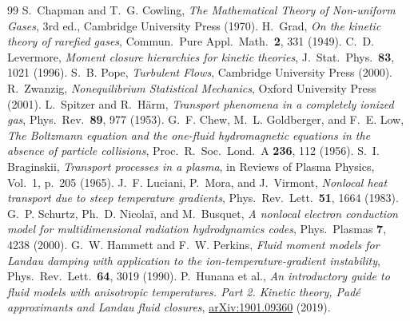 \documentclass[11pt]{article}
\begin{document}
\begin{thebibliography}{99}
S.~Chapman and T.~G. Cowling,
\emph{The Mathematical Theory of Non-uniform Gases},
3rd ed., Cambridge University Press (1970).
H.~Grad,
\emph{On the kinetic theory of rarefied gases},
Commun.\ Pure Appl.\ Math.\ \textbf{2}, 331 (1949).
C.~D. Levermore,
\emph{Moment closure hierarchies for kinetic theories},
J.\ Stat.\ Phys.\ \textbf{83}, 1021 (1996).
S.~B. Pope,
\emph{Turbulent Flows},
Cambridge University Press (2000).
R.~Zwanzig,
\emph{Nonequilibrium Statistical Mechanics},
Oxford University Press (2001).
L.~Spitzer and R.~H\"arm,
\emph{Transport phenomena in a completely ionized gas},
Phys.\ Rev.\ \textbf{89}, 977 (1953).
G.~F. Chew, M.~L. Goldberger, and F.~E. Low,
\emph{The Boltzmann equation and the one-fluid hydromagnetic equations in
the absence of particle collisions},
Proc.\ R.\ Soc.\ Lond.\ A \textbf{236}, 112 (1956).
S.~I. Braginskii,
\emph{Transport processes in a plasma},
in Reviews of Plasma Physics, Vol.~1, p.~205 (1965).
J.~F. Luciani, P.~Mora, and J.~Virmont,
\emph{Nonlocal heat transport due to steep temperature gradients},
Phys.\ Rev.\ Lett.\ \textbf{51}, 1664 (1983).
G.~P. Schurtz, Ph.~D. Nicola\"i, and M.~Busquet,
\emph{A nonlocal electron conduction model for multidimensional radiation
hydrodynamics codes},
Phys.\ Plasmas \textbf{7}, 4238 (2000).
G.~W. Hammett and F.~W. Perkins,
\emph{Fluid moment models for Landau damping with application to the
ion-temperature-gradient instability},
Phys.\ Rev.\ Lett.\ \textbf{64}, 3019 (1990).
P.~Hunana et al.,
\emph{An introductory guide to fluid models with anisotropic temperatures.
Part 2. Kinetic theory, Pad\'e approximants and Landau fluid closures},
\href{https://arxiv.org/abs/1901.09360}{arXiv:1901.09360} (2019).
\end{thebibliography}
\end{document}
